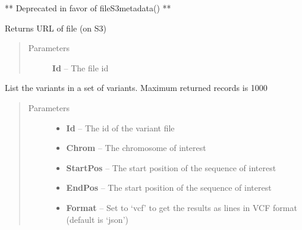 \documentclass[letterpaper,10pt,english]{sphinxmanual}
\begin{document}
\begin{fulllineitems}
\begin{fulllineitems}
\begin{quote}
\begin{description}
\end{description}\end{quote}

\end{fulllineitems}


\begin{fulllineitems}
\label{Available modules:BaseSpacePy.api.BaseSpaceAPI.BaseSpaceAPI.fileUrl}
** Deprecated in favor of fileS3metadata() **

Returns URL of file (on S3)
\begin{quote}\begin{description}
\item[{Parameters}] \leavevmode
\textbf{Id} -- The file id

\end{description}\end{quote}

\end{fulllineitems}


\begin{fulllineitems}
\label{Available modules:BaseSpacePy.api.BaseSpaceAPI.BaseSpaceAPI.filterVariantSet}
List the variants in a set of variants. Maximum returned records is 1000
\begin{quote}\begin{description}
\item[{Parameters}] \leavevmode\begin{itemize}
\item {} 
\textbf{Id} -- The id of the variant file

\item {} 
\textbf{Chrom} -- The chromosome of interest

\item {} 
\textbf{StartPos} -- The start position of the sequence of interest

\item {} 
\textbf{EndPos} -- The start position of the sequence of interest

\item {} 
\textbf{Format} -- Set to `vcf' to get the results as lines in VCF format (default is `json')


\end{itemize}
\end{description}
\end{quote}
\end{fulllineitems}
\end{fulllineitems}
\end{document}
